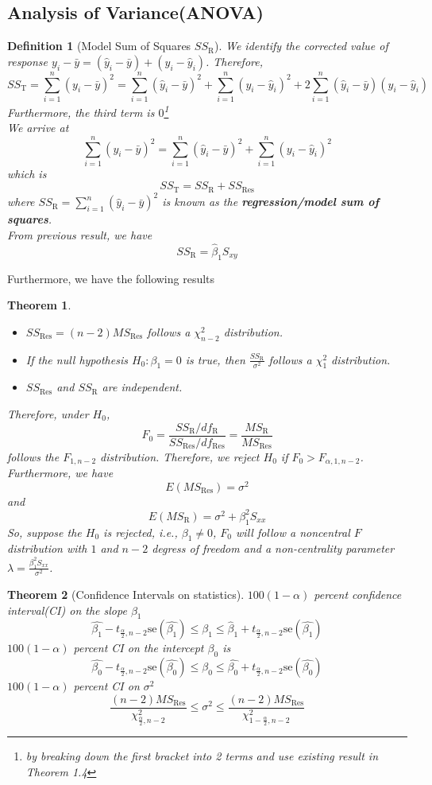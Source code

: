 \documentclass[11pt]{article}
\newcommand{\se}{\mathrm{se}}
\newtheorem{definition}{Definition}[section]
\newtheorem{theorem}{Theorem}[section]
\theoremstyle{definition}
\begin{document}
\subsection{Analysis of Variance(ANOVA)}
\begin{definition}[Model Sum of Squares {$SS_\text{R}$}]
\normalfont We identify the corrected value of response $y_i-\bar{y} = (\hat{y}_i - \bar{y}) + (y_i-\hat{y}_i)$. Therefore,
\[
SS_\text{T} = \sum_{i=1}^n (y_i-\bar{y})^2 = \sum_{i=1}^n (\hat{y}_i - \bar{y})^2 +  \sum_{i=1}^n (y_i-\hat{y}_i)^2 +2\sum_{i=1}^n (\hat{y}_i - \bar{y}) (y_i-\hat{y}_i)
\]
Furthermore, the third term is $0$\footnote{by breaking down the first bracket into 2 terms and use existing result in Theorem 1.4}\\
We arrive at
\[
\sum_{i=1}^n (y_i-\bar{y})^2 = \sum_{i=1}^n (\hat{y}_i - \bar{y})^2  +  \sum_{i=1}^n (y_i-\hat{y}_i)^2 
\]
which is
\[
SS_\text{T} = SS_\text{R}+SS_\text{Res}
\]
where $SS_\text{R} = \sum_{i=1}^n (\hat{y}_i - \bar{y})^2 $ is known as the \textbf{regression/model sum of squares}.\\
From previous result, we have 
\[
SS_\text{R} = \hat{\beta}_1 S_{xy}
\] 
\end{definition}
Furthermore, we have the following results
\begin{theorem}
\normalfont \begin{itemize}
\item $SS_\text{Res} = (n-2) MS_\text{Res}$ follows a $\chi_{n-2}^2$ distribution.
\item If the null hypothesis $H_0:\beta_1=0$ is true, then $\frac{SS_\text{R}}{\sigma^2}$ follows a $\chi_1^2$ distribution.
\item $SS_\text{Res}$ and $SS_\text{R}$ are independent.
\end{itemize}
Therefore, under $H_0$, 
\[
F_0 = \frac{SS_\text{R}/df_\text{R}}{SS_\text{Res}/df_\text{Res}} = \frac{MS_\text{R}}{MS_\text{Res}}
\]
follows the $F_{1,n-2}$ distribution.
Therefore, we reject $H_0$ if $F_0> F_{\alpha, 1, n-2}$.
Furthermore, we have
\[
E(MS_\text{Res}) = \sigma^2
\]
and
\[
E(MS_\text{R}) = \sigma^2+\beta_1^2 S_{xx}
\]
So, suppose the $H_0$ is rejected, i.e., $\beta_1\neq 0$, $F_0$ will follow a noncentral $F$ distribution with $1$ and $n-2$ degress of freedom and a non-centrality parameter $\lambda=\frac{\beta_1^2 S_{xx}}{\sigma^2}$.
\end{theorem}
\begin{theorem}[Confidence Intervals on statistics]
\normalfont $100(1-\alpha)$ percent confidence interval(CI) on the slope $\beta_1$
\[
\hat{\beta_1} -t_{\frac{\alpha}{2}, n-2} \se(\hat{\beta_1})\leq\beta_1\leq \hat{\beta}_1 +t_{\frac{\alpha}{2}, n-2} \se(\hat{\beta_1})
\]
$100(1-\alpha)$ percent CI on the intercept $\beta_0$ is
\[
\hat{\beta_0} -t_{\frac{\alpha}{2}, n-2}\se(\hat{\beta_0})\leq\beta_0\leq \hat{\beta_0} +t_{\frac{\alpha}{2}, n-2}\se(\hat{\beta_0})
\]
$100(1-\alpha)$ percent CI on $\sigma^2$
\[
\frac{(n-2) MS_\text{Res}}{\chi^2_{\frac{\alpha}{2}, n-2}}\leq \sigma^2\leq\frac{(n-2) MS_\text{Res}}{\chi^2_{1-\frac{\alpha}{2}, n-2}} 
\]
\end{theorem}
\end{document}
